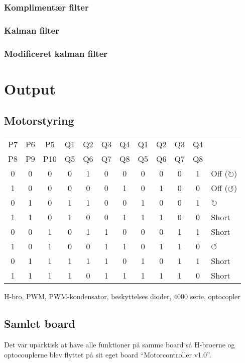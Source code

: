\documentclass[a4paper,oneside,article,danish,table,draft]{memoir}
\begin{document}
\subsubsection{Komplimentær filter}
\subsubsection{Kalman filter}
\subsubsection{Modificeret kalman filter}

\section{Output}

\subsection{Motorstyring}
\begin{table}[htbp]
  \centering
  \begin{tabular}{ccc|cccc|ccccl}
      \toprule
     P7&P6&P5 &Q1&Q2&Q3&Q4 &Q1&Q2&Q3&Q4\\
     P8&P9&P10 &Q5&Q6&Q7&Q8 &Q5&Q6&Q7&Q8\\
     \midrule
     0&0&0 &0&1&0&0 &0&0&0&1 & Off ($\circlearrowright$)\\
     1&0&0 &0&0&0&1 &0&1&0&0 & Off ($\circlearrowleft$)\\
     0&1&0 &1&1&0&0 &1&0&0&1 & $\circlearrowright$\\
     1&1&0 &1&0&0&1 &1&1&0&0 & Short\\
     0&0&1 &0&1&1&0 &0&0&1&1 & Short\\
     1&0&1 &0&0&1&1 &0&1&1&0 & $\circlearrowleft$\\
     0&1&1 &1&1&1&0 &1&0&1&1 & Short\\
     1&1&1 &1&0&1&1 &1&1&1&0 & Short\\
    \end{tabular}
  \end{table}

H-bro, PWM, PWM-kondensator, beskyttelses dioder, 4000 serie, optocopler

\subsection{Samlet board}
Det var uparktisk at have alle funktioner på samme board så H-broerne og optocouplerne blev flyttet på sit eget board “Motorcontroller v1.0”.
\end{document}
